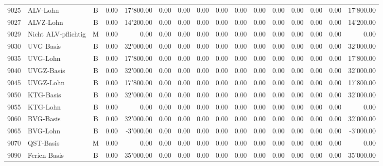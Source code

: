 \documentclass[8pt,a4paper]{extarticle}
\begin{document}
\begin{longtable}{@{\extracolsep{\fill}} l l c r r r r r r r r r r r r r}
9025&ALV-Lohn&B&0.00&17'800.00&0.00&0.00&0.00&0.00&0.00&0.00&0.00&0.00&0.00&0.00&17'800.00\\
9027&ALVZ-Lohn&B&0.00&14'200.00&0.00&0.00&0.00&0.00&0.00&0.00&0.00&0.00&0.00&0.00&14'200.00\\
9029&Nicht ALV-pflichtig&M&0.00&0.00&0.00&0.00&0.00&0.00&0.00&0.00&0.00&0.00&0.00&0.00&0.00\\
9030&UVG-Basis&B&0.00&32'000.00&0.00&0.00&0.00&0.00&0.00&0.00&0.00&0.00&0.00&0.00&32'000.00\\
9035&UVG-Lohn&B&0.00&17'800.00&0.00&0.00&0.00&0.00&0.00&0.00&0.00&0.00&0.00&0.00&17'800.00\\
9040&UVGZ-Basis&B&0.00&32'000.00&0.00&0.00&0.00&0.00&0.00&0.00&0.00&0.00&0.00&0.00&32'000.00\\
9045&UVGZ-Lohn&B&0.00&17'800.00&0.00&0.00&0.00&0.00&0.00&0.00&0.00&0.00&0.00&0.00&17'800.00\\
9050&KTG-Basis&B&0.00&32'000.00&0.00&0.00&0.00&0.00&0.00&0.00&0.00&0.00&0.00&0.00&32'000.00\\
9055&KTG-Lohn&B&0.00&0.00&0.00&0.00&0.00&0.00&0.00&0.00&0.00&0.00&0.00&0.00&0.00\\
9060&BVG-Basis&B&0.00&32'000.00&0.00&0.00&0.00&0.00&0.00&0.00&0.00&0.00&0.00&0.00&32'000.00\\
9065&BVG-Lohn&B&0.00&-3'000.00&0.00&0.00&0.00&0.00&0.00&0.00&0.00&0.00&0.00&0.00&-3'000.00\\
9070&QST-Basis&M&0.00&0.00&0.00&0.00&0.00&0.00&0.00&0.00&0.00&0.00&0.00&0.00&0.00\\
9090&Ferien-Basis&B&0.00&35'000.00&0.00&0.00&0.00&0.00&0.00&0.00&0.00&0.00&0.00&0.00&35'000.00\\

\end{longtable}
\pagebreak
\end{document}
